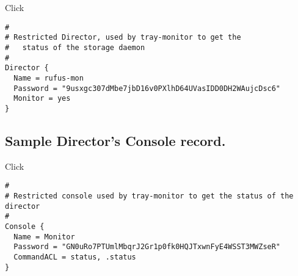 Click 

\footnotesize
\begin{verbatim}
#
# Restricted Director, used by tray-monitor to get the
#   status of the storage daemon
#
Director {
  Name = rufus-mon
  Password = "9usxgc307dMbe7jbD16v0PXlhD64UVasIDD0DH2WAujcDsc6"
  Monitor = yes
}
\end{verbatim}
\normalsize

\subsection{Sample Director's Console record.}

Click 

\footnotesize
\begin{verbatim}
#
# Restricted console used by tray-monitor to get the status of the director
#
Console {
  Name = Monitor
  Password = "GN0uRo7PTUmlMbqrJ2Gr1p0fk0HQJTxwnFyE4WSST3MWZseR"
  CommandACL = status, .status
}
\end{verbatim}
\normalsize
